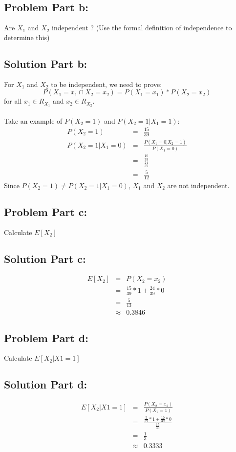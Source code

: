 \documentclass[12pt]{article}%
\begin{document}
\subsection*{Problem Part b:}
Are $X_1$ and $X_2$ independent ? (Use the formal definition of independence to determine this)
\subsection*{Solution Part b:}
For $X_1$ and $X_2$ to be independent, we need to prove: \begin{equation*}
P(X_1=x_1 \cap X_2=x_2) = P(X_1=x_1) * P(X_2=x_2)
\end{equation*}
for all $x_1 \in R_{X_1}$ and $x_2 \in R_{X_2}$. \\ \\
Take an example of $P(X_2=1)$ and $P(X_2=1 | X_1=1)$:
\begin{eqnarray*}
P(X_2=1) & = & \frac{15}{39} \\
P(X_2=1 | X_1=0) & = & \frac{P(X_1=0 | X_2=1)}{P(X_1=0)} \\
				 & = & \frac{\frac{10}{39}}{\frac{24}{39}} \\
				 & = &\frac{5}{12} 
\end{eqnarray*}
Since $P(X_2=1)\neq P(X_2=1 | X_1=0)$, $X_1$ and $X_2$ are not independent. 
\subsection*{Problem Part c:}
Calculate $E[X_2]$
\subsection*{Solution Part c:}
\begin{eqnarray*}
E[X_2] & = & P(X_2 = x_2) \\
	   & = & \frac{15}{39} * 1 + \frac{24}{39} * 0 \\
	   & = & \frac{5}{13} \\
	   & \approx & 0.3846
\end{eqnarray*}
\subsection*{Problem Part d:}
Calculate $E[X_2|X1 = 1]$
\subsection*{Solution Part d:}
\begin{eqnarray*}
E[X_2|X1 = 1] & = & \frac{P(X_2 = x_2)}{P(X_1=1)} \\
	   & = & \frac{\frac{5}{39}*1+\frac{10}{39}*0}{\frac{15}{39}} \\
	   & = & \frac{1}{3} \\
	   & \approx & 0.3333
\end{eqnarray*}
\end{document}
